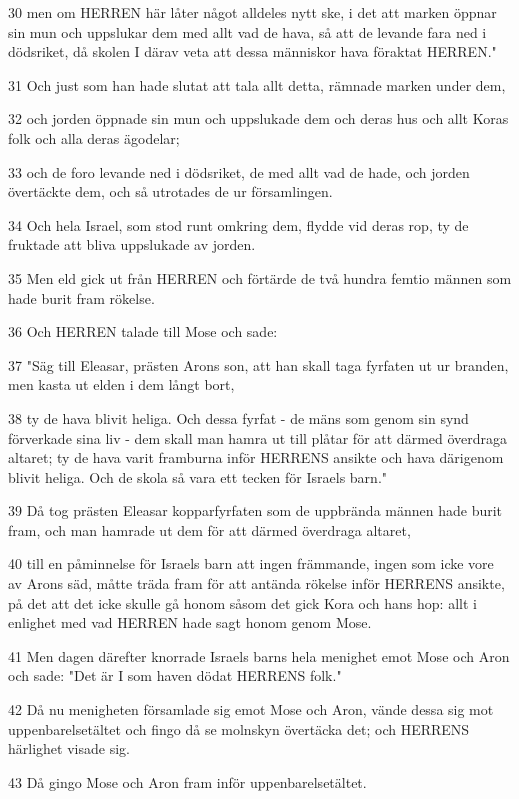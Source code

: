 \par 30 men om HERREN här låter något alldeles nytt ske, i det att marken öppnar sin mun och uppslukar dem med allt vad de hava, så att de levande fara ned i dödsriket, då skolen I därav veta att dessa människor hava föraktat HERREN."
\par 31 Och just som han hade slutat att tala allt detta, rämnade marken under dem,
\par 32 och jorden öppnade sin mun och uppslukade dem och deras hus och allt Koras folk och alla deras ägodelar;
\par 33 och de foro levande ned i dödsriket, de med allt vad de hade, och jorden övertäckte dem, och så utrotades de ur församlingen.
\par 34 Och hela Israel, som stod runt omkring dem, flydde vid deras rop, ty de fruktade att bliva uppslukade av jorden.
\par 35 Men eld gick ut från HERREN och förtärde de två hundra femtio männen som hade burit fram rökelse.
\par 36 Och HERREN talade till Mose och sade:
\par 37 "Säg till Eleasar, prästen Arons son, att han skall taga fyrfaten ut ur branden, men kasta ut elden i dem långt bort,
\par 38 ty de hava blivit heliga. Och dessa fyrfat - de mäns som genom sin synd förverkade sina liv - dem skall man hamra ut till plåtar för att därmed överdraga altaret; ty de hava varit framburna inför HERRENS ansikte och hava därigenom blivit heliga. Och de skola så vara ett tecken för Israels barn."
\par 39 Då tog prästen Eleasar kopparfyrfaten som de uppbrända männen hade burit fram, och man hamrade ut dem för att därmed överdraga altaret,
\par 40 till en påminnelse för Israels barn att ingen främmande, ingen som icke vore av Arons säd, måtte träda fram för att antända rökelse inför HERRENS ansikte, på det att det icke skulle gå honom såsom det gick Kora och hans hop: allt i enlighet med vad HERREN hade sagt honom genom Mose.
\par 41 Men dagen därefter knorrade Israels barns hela menighet emot Mose och Aron och sade: "Det är I som haven dödat HERRENS folk."
\par 42 Då nu menigheten församlade sig emot Mose och Aron, vände dessa sig mot uppenbarelsetältet och fingo då se molnskyn övertäcka det; och HERRENS härlighet visade sig.
\par 43 Då gingo Mose och Aron fram inför uppenbarelsetältet.
